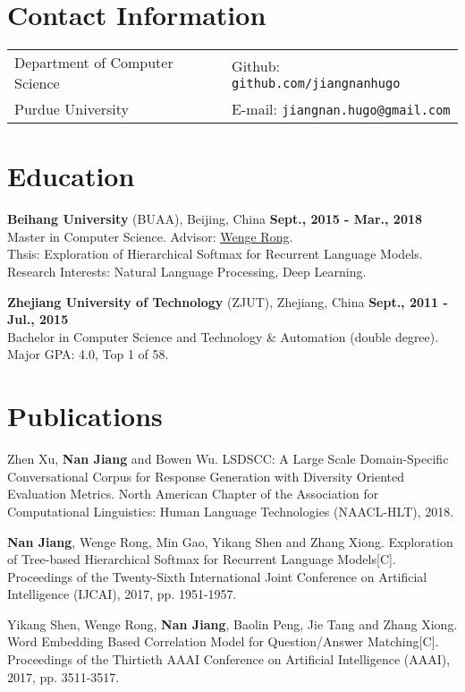 \documentclass[margin,line]{resume}
\begin{document}

\begin{resume}
\section{Contact Information}
\begin{tabular}{@{}p{3.5in}p{3.5in}}
Department of Computer Science  & { Github:} {\tt github.com/jiangnanhugo} \\
Purdue University                 & { E-mail:}  {\tt jiangnan.hugo@gmail.com}  \\
\end{tabular}


\section{Education}
{\bf Beihang University} (BUAA), Beijing, China \hfill {\bf Sept., 2015 - Mar., 2018}\\
Master in Computer Science. Advisor: \underline{\href{http://dblp.uni-trier.de/pers/hd/r/Rong:Wenge}{Wenge Rong}}.\\
Thsis: Exploration of Hierarchical Softmax for Recurrent Language Models. \\
Research Interests: Natural Language Processing, Deep Learning.

{\bf Zhejiang University of Technology} (ZJUT), Zhejiang, China \hfill {\bf Sept., 2011 - Jul., 2015}\\
Bachelor in Computer Science and Technology \& Automation (double degree). \\
\space Major GPA: 4.0, Top 1 of 58.


\section{Publications}
Zhen Xu, \textbf{Nan Jiang} and Bowen Wu. LSDSCC: A Large Scale Domain-Specific Conversational Corpus for Response Generation with Diversity Oriented Evaluation Metrics. North American Chapter of the Association for Computational Linguistics: Human Language Technologies (NAACL-HLT), 2018.

\textbf{Nan Jiang}, Wenge Rong, Min Gao, Yikang Shen and Zhang Xiong. Exploration of Tree-based Hierarchical Softmax for Recurrent Language Models[C]. Proceedings of the Twenty-Sixth International Joint Conference on Artificial Intelligence (IJCAI), 2017, pp. 1951-1957.


Yikang Shen, Wenge Rong, \textbf{Nan Jiang}, Baolin Peng, Jie Tang and Zhang Xiong. Word Embedding Based Correlation Model for Question/Answer Matching[C]. Proceedings of the Thirtieth {AAAI} Conference on Artificial Intelligence (AAAI), 2017, pp. 3511-3517.


\end{resume}
\end{document}
